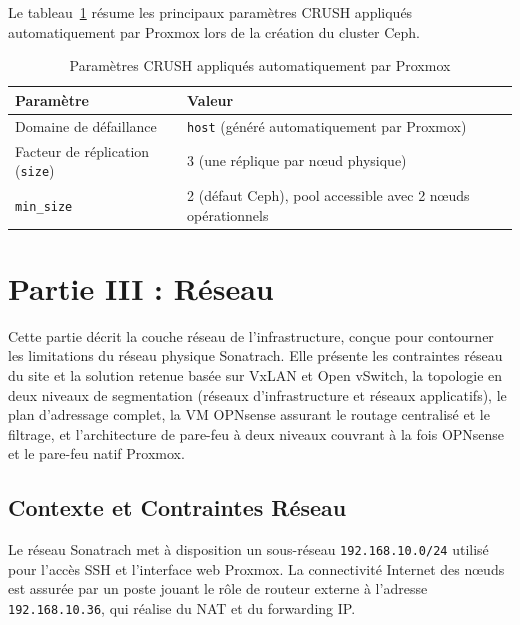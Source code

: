 \par Le tableau~\ref{tab:crush-params} résume les principaux paramètres CRUSH appliqués automatiquement par Proxmox lors de la création du cluster Ceph.\\

\begin{table}[H]
\centering
\caption{Paramètres CRUSH appliqués automatiquement par Proxmox}
\label{tab:crush-params}
\begin{tabular}{|p{4.5cm}|p{9cm}|}
\hline
\textbf{Paramètre} & \textbf{Valeur} \\
\hline
Domaine de défaillance & \texttt{host} (généré automatiquement par Proxmox) \\
\hline
Facteur de réplication (\texttt{size}) & 3 (une réplique par nœud physique) \\
\hline
\texttt{min\_size} & 2 (défaut Ceph), pool accessible avec 2 nœuds opérationnels \\
\hline
\end{tabular}
\end{table}

\section{Partie III : Réseau}

\par Cette partie décrit la couche réseau de l'infrastructure, conçue pour contourner les limitations du réseau physique Sonatrach. Elle présente les contraintes réseau du site et la solution retenue basée sur VxLAN et Open vSwitch, la topologie en deux niveaux de segmentation (réseaux d'infrastructure et réseaux applicatifs), le plan d'adressage complet, la VM OPNsense assurant le routage centralisé et le filtrage, et l'architecture de pare-feu à deux niveaux couvrant à la fois OPNsense et le pare-feu natif Proxmox.\\

\subsection{Contexte et Contraintes Réseau}

\par Le réseau Sonatrach met à disposition un sous-réseau \texttt{192.168.10.0/24} utilisé pour l'accès SSH et l'interface web Proxmox. La connectivité Internet des nœuds est assurée par un poste jouant le rôle de routeur externe à l'adresse \texttt{192.168.10.36}, qui réalise du NAT et du forwarding IP.\\

